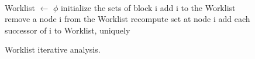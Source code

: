 \begin{figure}
\begin{framed}
{\tt
  \begin{program}{0}
   Worklist $\leftarrow$ $\phi$
   
   initialize the sets of block i
   add i to the Worklist
   
   remove a node i from the Worklist 
   recompute set at node i
   
   add each successor of i to Worklist, uniquely
  \end{program}
}
\end{framed}
  \caption{Worklist iterative analysis. \label{fig:dataIter2}}
\end{figure}
%

